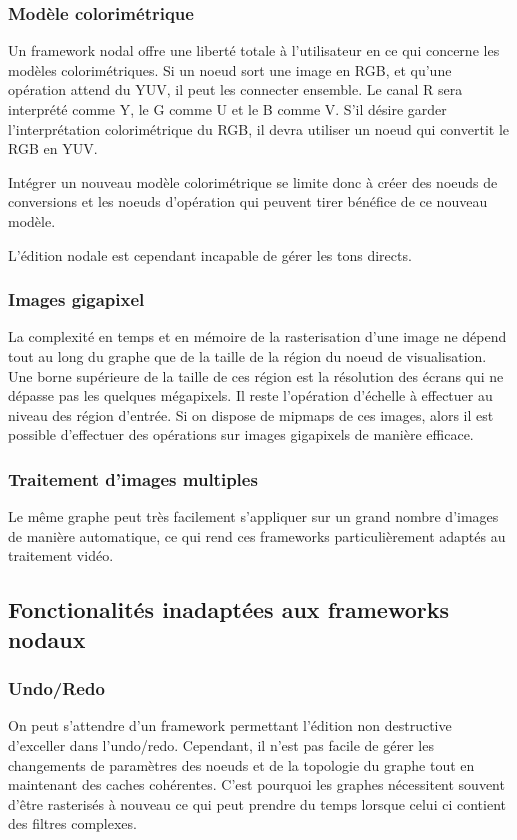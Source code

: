 			\subsubsection{Modèle colorimétrique}
				Un framework nodal offre une liberté totale à l'utilisateur en ce qui concerne les modèles colorimétriques. Si un noeud sort
				une image en RGB, et qu'une opération attend du YUV, il peut les connecter ensemble. Le canal R sera interprété comme Y, le G comme
				U et le B comme V. S'il désire garder l'interprétation colorimétrique du RGB, il devra utiliser un noeud qui convertit le RGB en YUV.

				Intégrer un nouveau modèle colorimétrique se limite donc à créer des noeuds de conversions et les noeuds d'opération qui peuvent
				tirer bénéfice de ce nouveau modèle.

				L'édition nodale est cependant incapable de gérer les tons directs.
			
				
			\subsubsection{Images gigapixel}
				La complexité en temps et en mémoire de la rasterisation d'une image ne dépend tout au long du graphe que de la taille de
				la région du noeud de visualisation. Une borne supérieure de la taille de ces région est la résolution des écrans qui ne
				dépasse pas les quelques mégapixels. Il reste l'opération d'échelle à effectuer au niveau des région d'entrée. Si on
				dispose de mipmaps de ces images, alors il est possible d'effectuer des opérations sur images gigapixels de manière efficace.
			\subsubsection{Traitement d'images multiples}
				Le même graphe peut très facilement s'appliquer sur un grand nombre d'images de manière automatique, ce qui rend ces frameworks
				particulièrement adaptés au traitement vidéo.
				
		\subsection{Fonctionalités inadaptées aux frameworks nodaux}
			\subsubsection{Undo/Redo}
				On peut s'attendre d'un framework permettant l'édition non destructive d'exceller dans l'undo/redo. Cependant, il n'est pas
				facile de gérer les changements de paramètres des noeuds et de la topologie du graphe tout en maintenant des caches cohérentes.
				C'est pourquoi les graphes nécessitent souvent d'être rasterisés à nouveau ce qui peut prendre du temps lorsque celui ci contient
				des filtres complexes. 
